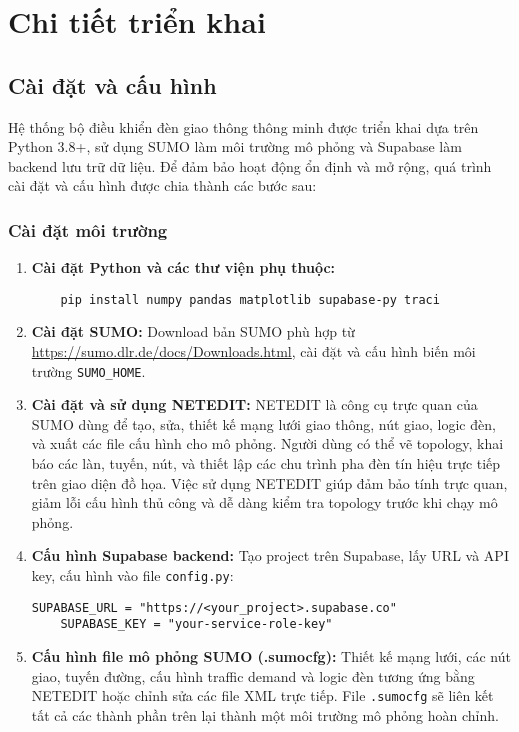\chapter{Chi tiết triển khai}

\section{Cài đặt và cấu hình}

Hệ thống bộ điều khiển đèn giao thông thông minh được triển khai dựa trên Python 3.8+, sử dụng SUMO làm môi trường mô phỏng và Supabase làm backend lưu trữ dữ liệu. Để đảm bảo hoạt động ổn định và mở rộng, quá trình cài đặt và cấu hình được chia thành các bước sau:

\subsection{Cài đặt môi trường}

\begin{enumerate}
    \item \textbf{Cài đặt Python và các thư viện phụ thuộc:}
    \begin{verbatim}
    pip install numpy pandas matplotlib supabase-py traci
    \end{verbatim}

    \item \textbf{Cài đặt SUMO:} 
    Download bản SUMO phù hợp từ \url{https://sumo.dlr.de/docs/Downloads.html}, cài đặt và cấu hình biến môi trường \texttt{SUMO\_HOME}.

    \item \textbf{Cài đặt và sử dụng NETEDIT:}
    NETEDIT là công cụ trực quan của SUMO dùng để tạo, sửa, thiết kế mạng lưới giao thông, nút giao, logic đèn, và xuất các file cấu hình cho mô phỏng. Người dùng có thể vẽ topology, khai báo các làn, tuyến, nút, và thiết lập các chu trình pha đèn tín hiệu trực tiếp trên giao diện đồ họa.
    Việc sử dụng NETEDIT giúp đảm bảo tính trực quan, giảm lỗi cấu hình thủ công và dễ dàng kiểm tra topology trước khi chạy mô phỏng.

    \item \textbf{Cấu hình Supabase backend:}
    Tạo project trên Supabase, lấy URL và API key, cấu hình vào file \texttt{config.py}:
    \begin{lstlisting}[style=py]
    SUPABASE_URL = "https://<your_project>.supabase.co"
    SUPABASE_KEY = "your-service-role-key"
    \end{lstlisting}
    
    \item \textbf{Cấu hình file mô phỏng SUMO (.sumocfg):}
    Thiết kế mạng lưới, các nút giao, tuyến đường, cấu hình traffic demand và logic đèn tương ứng bằng NETEDIT hoặc chỉnh sửa các file XML trực tiếp. File \texttt{.sumocfg} sẽ liên kết tất cả các thành phần trên lại thành một môi trường mô phỏng hoàn chỉnh.
\end{enumerate}
